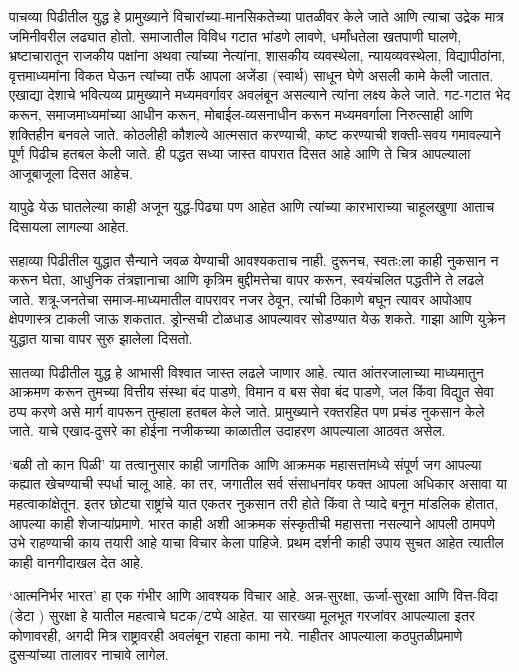 पाचव्या पिढीतील युद्ध हे प्रामुख्याने विचारांच्या-मानसिकतेच्या पातळीवर केले जाते आणि त्याचा उद्रेक मात्र जमिनीवरील लढ्यात होतो. समाजातील विविध गटात भांडणे लावणे, धर्मांधतेला खतपाणी घालणे, भ्रष्टाचारातून राजकीय पक्षांना अथवा त्यांच्या नेत्यांना, शासकीय व्यवस्थेला, न्यायव्यवस्थेला, विद्यापीठांना, वृत्तमाध्यमांना विकत घेऊन त्यांच्या तर्फे आपला अजेंडा (स्वार्थ) साधून घेणे असली कामे केली जातात. एखाद्या देशाचे भवित्यव्य प्रामुख्याने मध्यमवर्गावर अवलंबून असल्याने त्यांना लक्ष्य केले जाते. गट-गटात भेद करून, समाजमाध्यमांच्या आधीन करून, मोबाईल-व्यसनाधीन करून मध्यमवर्गाला निरुत्साही आणि शक्तिहीन बनवले जाते. कोठलीही कौशल्ये आत्मसात करण्याची, कष्ट करण्याची शक्ती-सवय गमावल्याने पूर्ण पिढीच हतबल केली जाते. ही पद्धत सध्या जास्त वापरात दिसत आहे आणि ते चित्र आपल्याला आजूबाजूला दिसत आहेच.

यापुढे येऊ घातलेल्या काही अजून युद्ध-पिढ्या पण आहेत आणि त्यांच्या कारभाराच्या चाहूलखुणा आताच दिसायला लागल्या आहेत.

सहाव्या पिढीतील युद्धात सैन्याने जवळ येण्याची आवश्यकताच नाही. दुरूनच, स्वतः:ला काही नुकसान न करून घेता, आधुनिक तंत्रज्ञानाचा आणि कृत्रिम बुद्दीमत्तेचा वापर करून, स्वयंचलित पद्धतीने ते लढले जाते. शत्रू-जनतेचा समाज-माध्यमातील वापरावर नजर ठेवून, त्यांची ठिकाणे बघून त्यावर आपोआप क्षेपणास्त्र टाकली जाऊ शकतात. ड्रोन्सची टोळधाड आपल्यावर सोडण्यात येऊ शकते. गाझा आणि युक्रेन युद्धात याचा वापर सुरु झालेला दिसतो.

सातव्या पिढीतील युद्ध हे आभासी विश्वात जास्त लढले जाणार आहे. त्यात आंतरजालाच्या माध्यमातुन आक्रमण करून तुमच्या वित्तीय संस्था बंद पाडणे, विमान व बस सेवा बंद पाडणे, जल किंवा विद्युत सेवा ठप्प करणे असे मार्ग वापरून तुम्हाला हतबल केले जाते. प्रामुख्याने रक्तरहित पण प्रचंड नुकसान केले जाते. याचे एखाद-दुसरे का होईना नजीकच्या काळातील उदाहरण आपल्याला आठवत असेल.

‘बळी तो कान पिळी’ या तत्वानुसार काही जागतिक आणि आक्रमक महासत्तांमध्ये संपूर्ण जग आपल्या कह्यात खेचण्याची स्पर्धा चालू आहे. का तर, जगातील सर्व संसाधनांवर फक्त आपला अधिकार असावा या महत्वाकांक्षेतून. इतर छोट्या राष्ट्रांचे यात एकतर नुकसान तरी होते किंवा ते प्यादे बनून मांडलिक होतात, आपल्या काही शेजाऱ्यांप्रमाणे. भारत काही अशी आक्रमक संस्कृतीची महासत्ता नसल्याने आपली ठामपणे उभे राहण्याची काय तयारी आहे याचा विचार केला पाहिजे. प्रथम दर्शनी काही उपाय सुचत आहेत त्यातील काही वानगीदाखल देत आहे.

‘आत्मनिर्भर भारत’ हा एक गंभीर आणि आवश्यक विचार आहे. अन्न-सुरक्षा, ऊर्जा-सुरक्षा आणि वित्त-विदा (डेटा ) सुरक्षा हे यातील महत्वाचे घटक/टप्पे आहेत. या सारख्या मूलभूत गरजांवर आपल्याला इतर कोणावरही, अगदी मित्र राष्ट्रावरही अवलंबून राहता कामा नये. नाहीतर आपल्याला कठपुतळीप्रमाणे दुसऱ्यांच्या तालावर नाचावे लागेल.

